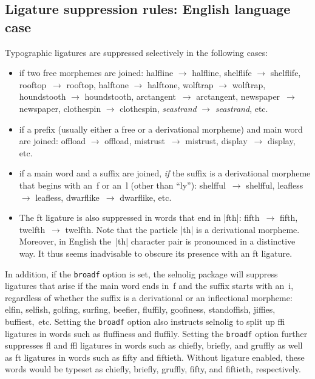 \documentclass[11pt]{article}
\newcommand{\pkg}[1]{\textsf{#1}}
\newcommand{\opt}[1]{\texttt{#1}}
\begin{document}
\subsection{Ligature suppression rules: English language case}


Typographic ligatures are suppressed selectively in the following cases:
\begin{itemize}
\item if two free morphemes are joined: \mbox{halfline} $\to$ halfline, \mbox{shelflife} $\to$ shelflife, \mbox{rooftop}~$\to$ rooftop, \mbox{halftone} $\to$ halftone, \mbox{wolftrap} $\to$ wolftrap, \mbox{houndstooth} $\to$ houndstooth, \mbox{arctan}\-gent~$\to$ arctangent, \mbox{newspaper}~$\to$ newspaper, \mbox{clothespin} $\to$ clothespin, \emph{se\mbox{as}trand} $\to$ \emph{seastrand}, etc.

\item if a prefix (usually either a free or a derivational morpheme) and main word are joined: \mbox{offload} $\to$ offload, mi\mbox{st}rust~$\to$ mistrust, di\mbox{sp}lay~$\to$ display, etc. 

\item if a main word and a suffix are joined, \emph{if} the suffix is a derivational morpheme that begins with an~f or an~l (other than \enquote{ly}): \mbox{shelfful}~$\to$ shelfful, \mbox{leafless} $\to$ leafless, \mbox{dwarflike}~$\to$ dwarflike, etc. 

\item The ft ligature is also suppressed in words that end in |fth|: \mbox{fifth}~$\to$ fifth, \mbox{twelfth}~$\to$ twelfth. Note that the particle |th| is a derivational morpheme. Moreover, in English the~|th| character pair is pronounced in a distinctive way. It thus seems inadvisable to obscure its presence with an ft ligature.
\end{itemize}

In addition, if the \opt{broadf} option is set, the \pkg{selnolig} package will suppress ligatures that arise if the main word ends in~f and the suffix starts with an~i, regardless of whether the suffix is a derivational or an inflectional morpheme: elfin, selfish, golfing, surfing, beefier, fluffily, goofiness, standoffish, jiffies, buffiest,~etc. Setting the \opt{broadf} option also instructs \pkg{selnolig} to split up ffi ligatures in words such as fluffiness and fluffily. Setting the \opt{broadf} option further suppresses fl and ffl ligatures in words such as chiefly, briefly, and gruffly as well as ft ligatures in words such as fifty and fiftieth. Without ligature enabled, these words would be typeset as chie\mbox{fl}y, brie\mbox{fl}y, gru\mbox{ffl}y, fi\mbox{ft}y, and fi\mbox{ft}ieth, respectively.
\end{document}
